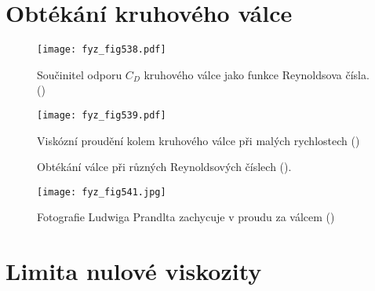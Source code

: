   \section{Obtékání kruhového válce}\label{fyz:IIchapXLIsecIV}
  
    \begin{figure}[ht!] %
      \centering
      \texttt{[image: fyz\_fig538.pdf]}
      \caption{Součinitel odporu \(C_D\) kruhového válce jako funkce Reynoldsova čísla.
               (\cite[s.~766]{Feynman02})}
      \label{fyz:fig538}
    \end{figure}
     
    \begin{figure}[ht!] %
      \centering
      \texttt{[image: fyz\_fig539.pdf]}
      \caption{Viskózní proudění kolem kruhového válce při malých rychlostech
              (\cite[s.~707]{Feynman02})}
      \label{fyz:fig539}
    \end{figure}   

    \begin{figure}[hb!] %
      \centering
        \newline
        \newline
        \newline
        \newline
      \caption{Obtékání válce při různých Reynoldsových číslech
               (\cite[s.~768]{Feynman02}).}
      \label{fyz:fig540}
    \end{figure}

    \begin{figure}[ht!] %
      \centering
      \texttt{[image: fyz\_fig541.jpg]}
      \caption{Fotografie Ludwiga Prandlta zachycuje  v proudu za válcem
               (\cite[s.~707]{Feynman02})}
      \label{fyz:fig541}
    \end{figure}
    
  \section{Limita nulové viskozity}\label{fyz:IIchapXLIsecV}
